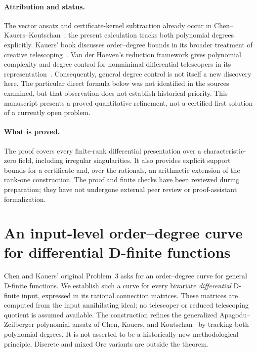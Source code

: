 \paragraph{Attribution and status.}
The vector ansatz and certificate-kernel subtraction already occur in
Chen--Kauers--Koutschan~\cite[Theorem~6]{CKK2014}; the present calculation
tracks both polynomial degrees explicitly. Kauers' book discusses
order--degree bounds in its broader treatment of creative
telescoping~\cite[Section~5.5]{Kauers2023}. Van der Hoeven's reduction
framework gives polynomial complexity and degree control for nonminimal
differential telescopers in its representation~\cite[Section~9]{vdH2018}.
Consequently, general degree control is not itself a new discovery here.
The particular direct formula below was not identified in the sources
examined, but that observation does not establish historical priority.
This manuscript presents a proved quantitative refinement, not a
certified first solution of a currently open problem.

\paragraph{What is proved.}
The proof covers every finite-rank differential presentation over a
characteristic-zero field, including irregular singularities. It also
provides explicit support bounds for a certificate and, over the
rationals, an arithmetic extension of the rank-one construction.
The proof and finite checks have been reviewed during preparation;
they have not undergone external peer review or proof-assistant
formalization.
\section{An input-level order--degree curve for differential D-finite functions}
\label{gd:section}

Chen and Kauers' original Problem~3 asks for an order--degree curve for
general D-finite functions. We establish such a curve for every bivariate
\emph{differential} D-finite input, expressed in its rational connection
matrices. These matrices are computed from the input annihilating ideal;
no telescoper or reduced telescoping quotient is assumed available.
The construction refines the generalized Apagodu--Zeilberger polynomial
ansatz of Chen, Kauers, and Koutschan~\cite{CKK2014} by tracking both polynomial
degrees. It is not asserted to be a historically new methodological
principle. Discrete and mixed Ore variants are outside the theorem.


